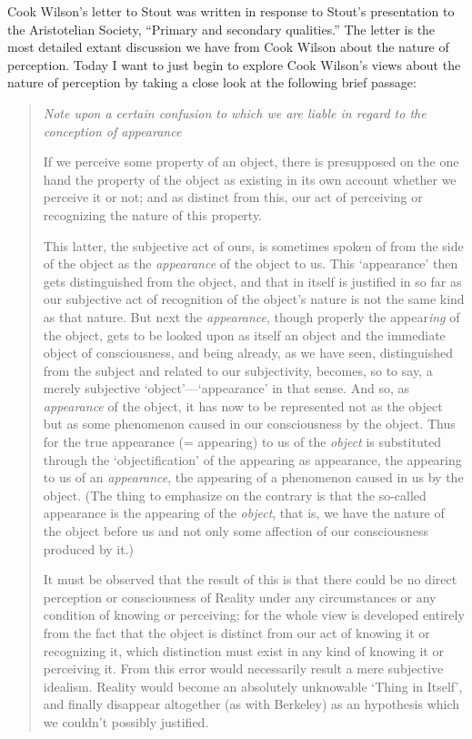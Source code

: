 \documentclass[12pt]{article}
\begin{document}
Cook Wilson's letter to Stout was written in response to Stout's \citeyearpar{Stout:1903zl} presentation to the Aristotelian Society, ``Primary and secondary qualities.'' The letter is the most detailed extant discussion we have from Cook Wilson about the nature of perception. Today I want to just begin to explore Cook Wilson's views about the nature of perception by taking a close look at the following brief passage:
\begin{quotation}
	\noindent \emph{Note upon a certain confusion to which we are liable in regard to the conception of appearance}
	
	If we perceive some property of an object, there is presupposed on the one hand the property of the object as existing in its own account whether we perceive it or not; and as distinct from this, our act of perceiving or recognizing the nature of this property.
	
	This latter, the subjective act of ours, is sometimes spoken of from the side of the object as the \emph{appearance} of the object to us. This `appearance' then gets distinguished from the object, and that in itself is justified in so far as our subjective act of recognition of the object's nature is not the same kind as that nature. But next the \emph{appearance}, though properly the appear\emph{ing} of the object, gets to be looked upon as itself an object and the immediate object of consciousness, and being already, as we have seen, distinguished from the subject and related to our subjectivity, becomes, so to say, a merely subjective `object'---`appearance' in that sense. And so, as \emph{appearance} of the object, it has now to be represented not as the object but as some phenomenon caused in our consciousness by the object. Thus for the true appearance (= appearing) to us of the \emph{object} is substituted through the `objectification' of the appearing as appearance, the appearing to us of an \emph{appearance}, the appearing of a phenomenon caused in us by the object. (The thing to emphasize on the contrary is that the so-called appearance is the appearing of the \emph{object}, that is, we have the nature of the object before us and not only some affection of our consciousness produced by it.)

	It must be observed that the result of this is that there could be no direct perception or consciousness of Reality under any circumstances or any condition of knowing or perceiving; for the whole view is developed entirely from the fact that the object is distinct from our act of knowing it or recognizing it, which distinction must exist in any kind of knowing it or perceiving it. From this error would necessarily result a mere subjective idealism. Reality would become an absolutely unknowable `Thing in Itself', and finally disappear altogether (as with Berkeley) as an hypothesis which we couldn't possibly justified. \citep[\emph{Correspondence with Stout 1904},][796-797]{Cook-Wilson:1926sf}
\end{quotation}
\end{document}
